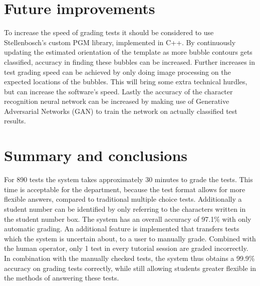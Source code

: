 \section{Future improvements}
To increase the speed of grading tests it should be considered to use Stellenbosch's custom PGM library, implemented in C++. By continuously updating the estimated orientation of the template as more bubble contours gets classified, accuracy in finding these bubbles can be increased. Further increases in test grading speed can be achieved by only doing image processing on the expected locations of the bubbles. This will bring some extra technical hurdles, but can increase the software's speed. Lastly the accuracy of the character recognition neural network can be increased by making use of Generative Adversarial Networks (GAN) to train the network on actually classified test results.

\section{Summary and conclusions}
For 890 tests the system takes approximately 30 minutes to grade the tests. This time is acceptable for the department, because the test format allows for more flexible answers, compared to traditional multiple choice tests. Additionally a student number can be identified by only referring to the characters written in the student number box. The system has an overall accuracy of 97.1\% with only automatic grading. An additional feature is implemented that transfers tests which the system is uncertain about, to a user to manually grade. Combined with the human operator, only 1 test in every tutorial session are graded incorrectly. In combination with the manually checked tests, the system thus obtains a 99.9\% accuracy on grading tests correctly, while still allowing students greater flexible in the methods of answering these tests.